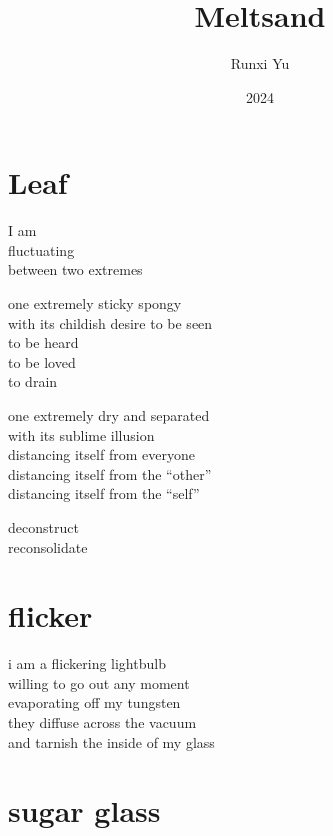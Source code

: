 \documentclass[parskip=full,12pt,oneside,openany,a5paper,numbers=endperiod]{scrbook}
\begin{document}
\title{Meltsand}
\author{Runxi Yu}
\date{2024}
\maketitle
\tableofcontents

\chapter{Leaf}

I am\\
\hphantom{I am} fluctuating\\
\hphantom{I am fluctuating} between two extremes

one extremely sticky spongy\\
\hspace*{2em}with its childish desire to be seen\\
\hspace*{4em}to be heard\\
\hspace*{6em}to be loved\\
\hspace*{8em}to drain

one extremely dry and separated\\
\hspace*{2em}with its sublime illusion\\
\hspace*{4em}distancing itself from everyone\\
\hspace*{6em}distancing itself from the ``other''\\
\hspace*{8em}distancing itself from the ``self''

deconstruct\\
reconsolidate

\chapter{flicker}

i am a flickering lightbulb\\
willing to go out any moment\\
evaporating off my tungsten\\
they diffuse across the vacuum\\
and tarnish the inside of my glass

\chapter{sugar glass}
\end{document}
